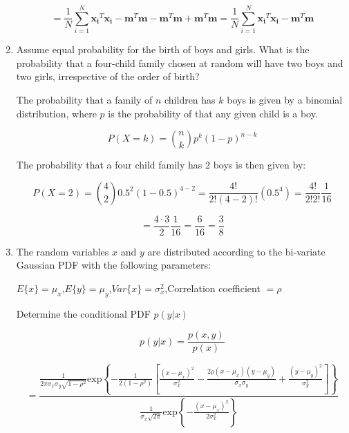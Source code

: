 \documentclass[fleqn]{article}
\begin{document}
\begin{enumerate}
		\begin{equation*}
			 = \frac{1}{N}\sum_{i=1}^{N}{\mathbf{x_i}^T\mathbf{x_i}}-\mathbf{m}^T\mathbf{m}-\mathbf{m}^T\mathbf{m}+\mathbf{m}^T\mathbf{m} = \frac{1}{N}\sum_{i=1}^{N}{\mathbf{x_i}^T\mathbf{x_i}}-\mathbf{m}^T\mathbf{m}
		\end{equation*}
		
		\item Assume equal probability for the birth of boys and girls. What is the probability that a four-child family chosen at random will have two boys and two girls, irrespective of the order of birth?
		
		The probability that a family of $n$ children has $k$ boys is given by a binomial distribution, where $p$ is the probability of that any given child is a boy.
		 
		\begin{equation*}
			P(X = k) = \binom{n}{k}p^k(1-p)^{n-k}
		\end{equation*}
		
		The probability that a four child family has 2 boys is then given by:
		
		\begin{equation*}
			P(X = 2) = \binom{4}{2}0.5^2(1-0.5)^{4-2} = \frac{4!}{2!(4-2)!}(0.5^4) = \frac{4!}{2!2!}\frac{1}{16} 
		\end{equation*}
		
		\begin{equation*}
			= \frac{4 \cdot 3}{2}\frac{1}{16} = \frac{6}{16} = \frac{3}{8}
		\end{equation*}
		
		\item The random variables $x$ and $y$ are distributed according to the bi-variate Gaussian PDF with the following parameters:
		
		$E\{x\} = \mu_x$,\quad$E\{y\} = \mu_y$,\quad$Var\{x\} = \sigma_x^2$,\quad Correlation coefficient $ = \rho$
		
		Determine the conditional PDF $p(y|x)$
		
		\begin{equation*}		
			p(y|x) = \frac{p(x,y)}{p(x)}
		\end{equation*}
		
		\begin{equation*}
			 = \frac{\frac{1}{2\pi\sigma_x\sigma_y\sqrt{1-\rho^2}}\text{exp}\left\{-\frac{1}{2(1-\rho^2)}\left[\frac{(x-\mu_x)^2}{\sigma_x^2}-\frac{2\rho(x-\mu_x)(y-\mu_y)}{\sigma_x\sigma_y}+\frac{(y-\mu_y)^2}{\sigma_y^2}\right]\right\}}{\frac{1}{\sigma_x\sqrt{2\pi}}\text{exp}\left\{-\frac{(x-\mu_x)^2}{2\sigma_x^2}\right\}}
		\end{equation*}
		

\end{enumerate}
\end{document}
